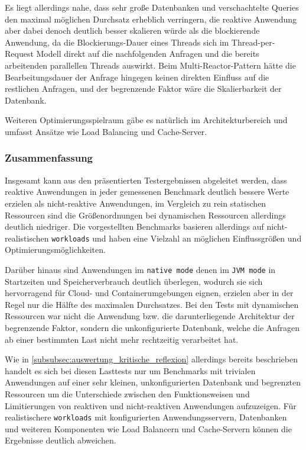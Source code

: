 Es liegt allerdings nahe, dass sehr große Datenbanken und verschachtelte Queries den maximal möglichen Durchsatz erheblich verringern,
die reaktive Anwendung aber dabei denoch deutlich besser skalieren würde als die blockierende Anwendung, da die Blockierungs-Dauer
eines Threads sich im Thread-per-Request Modell direkt auf die nachfolgenden Anfragen und die bereits arbeitenden parallellen Threads
auswirkt.
Beim Multi-Reactor-Pattern hätte die Bearbeitungsdauer der Anfrage hingegen keinen direkten Einfluss auf die restlichen Anfragen, und der
begrenzende Faktor wäre die Skalierbarkeit der Datenbank.

Weiteren Optimierungsspielraum gäbe es natürlich im Architekturbereich und umfasst Ansätze wie Load Balancing und Cache-Server.
\subsubsection{Zusammenfassung}
\label{subsubsec:auswertung_zusammenfassung}
Insgesamt kann aus den präsentierten Testergebnissen abgeleitet werden, dass reaktive Anwendungen in jeder gemessenen
Benchmark deutlich bessere Werte erzielen als nicht-reaktive Anwendungen, im Vergleich zu rein statischen Ressourcen
sind die Größenordnungen bei dynamischen Ressourcen allerdings deutlich niedriger.
Die vorgestellten Benchmarks basieren allerdings auf nicht-realistischen \verb|workloads| und haben eine Vielzahl an möglichen
Einflussgrößen und Optimierungsmöglichkeiten.

Darüber hinaus sind Anwendungen im \verb|native mode| denen im \verb|JVM mode| in Startzeiten und Speicherverbrauch deutlich überlegen,
wodurch sie sich hervorragend für Cloud- und Containerumgebungen eignen, erzielen aber in der Regel nur die Hälfte des maximalen Durchsatzes.
Bei den Tests mit dynamischen Ressourcen war nicht die Anwendung bzw. die darunterliegende Architektur der begrenzende Faktor,
sondern die unkonfigurierte Datenbank, welche die Anfragen ab einer bestimmten Last nicht mehr rechtzeitig verarbeitet hat.

Wie in \ref{subsubsec:auswertung_kritische_reflexion} allerdings bereits beschrieben handelt es sich bei diesen Lasttests nur um
Benchmarks mit trivialen Anwendungen auf einer sehr kleinen, unkonfigurierten Datenbank und begrenzten Ressourcen um
die Unterschiede zwischen den Funktionsweisen und Limitierungen von reaktiven und nicht-reaktiven Anwendungen aufzuzeigen.
Für realistischere \verb|workloads| mit konfigurierten Anwendungsservern, Datenbanken und weiteren Komponenten wie Load Balancern und
Cache-Servern können die Ergebnisse deutlich abweichen.
